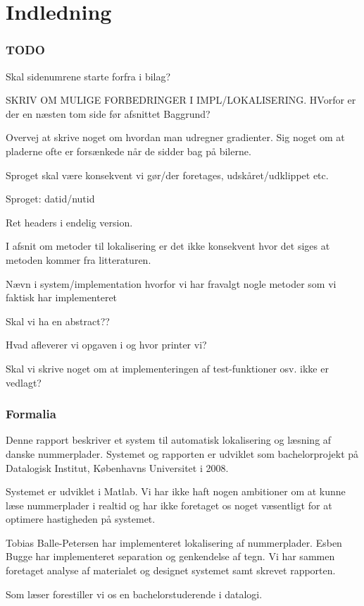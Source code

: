 \section{Indledning}

\subsubsection*{TODO}
Skal sidenumrene starte forfra i bilag?

SKRIV OM MULIGE FORBEDRINGER I IMPL/LOKALISERING.
HVorfor er der en næsten tom side før afsnittet Baggrund?

Overvej at skrive noget om hvordan man udregner gradienter.
Sig noget om at pladerne ofte er forsænkede når de sidder bag på bilerne.

Sproget skal være konsekvent vi gør/der foretages, udskåret/udklippet etc.

Sproget: datid/nutid

Ret headers i endelig version.

I afsnit om metoder til lokalisering er det ikke konsekvent hvor det siges at metoden kommer fra litteraturen.

Nævn i system/implementation hvorfor vi har fravalgt nogle metoder som vi faktisk har implementeret

Skal vi ha en abstract??

Hvad afleverer vi opgaven i og hvor printer vi?

Skal vi skrive noget om at implementeringen af test-funktioner osv. ikke er vedlagt?

\subsubsection*{Formalia}
Denne rapport beskriver et system til automatisk lokalisering og læsning af danske nummerplader. Systemet og rapporten er udviklet som bachelorprojekt på Datalogisk Institut, Københavns Universitet i 2008.

Systemet er udviklet i Matlab. Vi har ikke haft nogen ambitioner om at kunne læse nummerplader i realtid og har ikke foretaget os noget væsentligt for at optimere hastigheden på systemet.

Tobias Balle-Petersen har implementeret lokalisering af nummerplader. Esben Bugge har implementeret separation og genkendelse af tegn. Vi har sammen foretaget analyse af materialet og designet systemet samt skrevet rapporten.

Som læser forestiller vi os en bachelorstuderende i datalogi.


